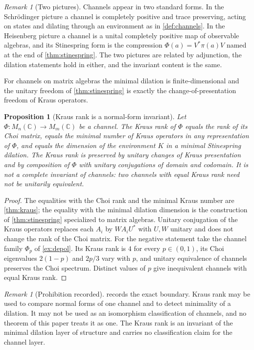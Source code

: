 \documentclass[11pt,letterpaper]{article}
\newtheorem{proposition}[theorem]{Proposition}
\theoremstyle{definition}
\theoremstyle{remark}
\newtheorem{remark}[theorem]{Remark}
\begin{document}
\begin{remark}[Two pictures]
\label{rem:pictures}
Channels appear in two standard forms. In the Schr\"odinger picture a channel is completely positive and trace preserving, acting on states and dilating through an environment as in \cref{def:channels}. In the Heisenberg picture a channel is a unital completely positive map of observable algebras, and its Stinespring form is the compression $\Phi(a) = V^* \pi(a) V$ named at the end of \cref{thm:stinespring}. The two pictures are related by adjunction, the dilation statements hold in either, and the invariant content is the same.
\end{remark}

For channels on matrix algebras the minimal dilation is finite-dimensional and the unitary freedom of \cref{thm:stinespring} is exactly the change-of-presentation freedom of Kraus operators.

\begin{proposition}[Kraus rank is a normal-form invariant]
\label{prop:krausrank}
Let $\Phi: M_n(\mathbb{C}) \to M_m(\mathbb{C})$ be a channel. The Kraus rank of $\Phi$ equals the rank of its Choi matrix, equals the minimal number of Kraus operators in any representation of $\Phi$, and equals the dimension of the environment $K$ in a minimal Stinespring dilation. The Kraus rank is preserved by unitary changes of Kraus presentation and by composition of $\Phi$ with unitary conjugations of domain and codomain. It is not a complete invariant of channels: two channels with equal Kraus rank need not be unitarily equivalent.
\end{proposition}

\begin{proof}
The equalities with the Choi rank and the minimal Kraus number are \cref{thm:kraus}; the equality with the minimal dilation dimension is the construction of \cref{thm:stinespring} specialized to matrix algebras. Unitary conjugation of the Kraus operators replaces each $A_i$ by $W A_i U^*$ with $U, W$ unitary and does not change the rank of the Choi matrix. For the negative statement take the channel family $\Phi_p$ of \cref{ex:depol}. Its Kraus rank is $4$ for every $p \in (0,1)$, its Choi eigenvalues $2(1-p)$ and $2p/3$ vary with $p$, and unitary equivalence of channels preserves the Choi spectrum. Distinct values of $p$ give inequivalent channels with equal Kraus rank.
\end{proof}

\begin{remark}[Prohibition recorded]
\label{rem:prohibition}
 records the exact boundary. Kraus rank may be used to compare normal forms of one channel and to detect minimality of a dilation. It may not be used as an isomorphism classification of channels, and no theorem of this paper treats it as one. The Kraus rank is an invariant of the minimal dilation layer of structure and carries no classification claim for the channel layer.
\end{remark}
\end{document}
